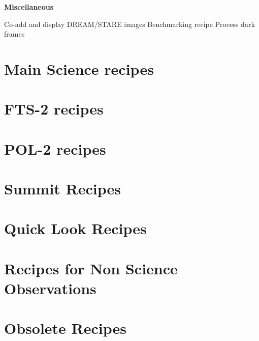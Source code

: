 \documentclass[twoside,11pt,nolof]{starlink}
\begin{document}
\begin{small}
{\large
\begin{center}
\textbf{Miscellaneous}
\end{center}
}
\begin{description}
Co-add and display DREAM/STARE images
Benchmarking recipe
Process dark frames
\end{description}


\end{small}


\section{Main Science recipes}


\section{FTS-2 recipes}


\section{POL-2 recipes}


\section{Summit Recipes}


\section{Quick Look Recipes}


\section{Recipes for Non Science Observations}


\section{Obsolete Recipes}

\end{document}
